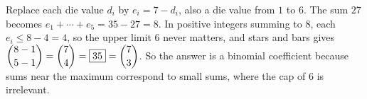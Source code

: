 Replace each die value $d_i$ by $e_i=7-d_i$, also a die value from $1$ to $6$. The sum $27$ becomes $e_1+\cdots+e_5=35-27=8$. In positive integers summing to $8$, each $e_i\le8-4=4$, so the upper limit $6$ never matters, and stars and bars gives $\dbinom{8-1}{5-1}=\dbinom74=\boxed{35}=\dbinom73$. So the answer is a binomial coefficient because sums near the maximum correspond to small sums, where the cap of $6$ is irrelevant.

